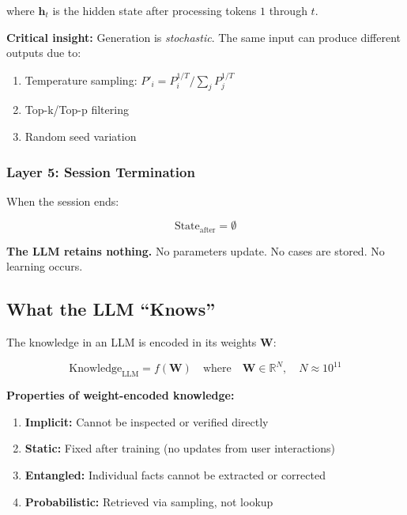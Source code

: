 where $\mathbf{h}_t$ is the hidden state after processing tokens $1$ through $t$.

\textbf{Critical insight:} Generation is \textit{stochastic}. The same input can produce different outputs due to:
\begin{enumerate}
    \item Temperature sampling: $P'_i = P_i^{1/T} / \sum_j P_j^{1/T}$
    \item Top-k/Top-p filtering
    \item Random seed variation
\end{enumerate}

\subsubsection{Layer 5: Session Termination}

When the session ends:

\begin{equation}
\text{State}_{\text{after}} = \emptyset
\end{equation}

\textbf{The LLM retains nothing.} No parameters update. No cases are stored. No learning occurs.


\subsection{What the LLM ``Knows''}

The knowledge in an LLM is encoded in its weights $\mathbf{W}$:

\begin{equation}
\text{Knowledge}_{\text{LLM}} = f(\mathbf{W}) \quad \text{where} \quad \mathbf{W} \in \mathbb{R}^{N}, \quad N \approx 10^{11}
\end{equation}

\textbf{Properties of weight-encoded knowledge:}
\begin{enumerate}
    \item \textbf{Implicit:} Cannot be inspected or verified directly
    \item \textbf{Static:} Fixed after training (no updates from user interactions)
    \item \textbf{Entangled:} Individual facts cannot be extracted or corrected
    \item \textbf{Probabilistic:} Retrieved via sampling, not lookup
\end{enumerate}

